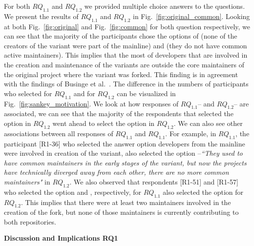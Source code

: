 \nd \textbf{\rqOne}

For both $RQ_{1.1}$ and $RQ_{1.2}$ we provided multiple choice answers to the questions. We present the results of $RQ_{1.1}$ and $RQ_{1.2}$ in Fig.~\ref{fig:original_common}. Looking at both Fig.~\ref{fig:original} and Fig.~\ref{fig:common} for both question respectively, we can see that the majority of the participants chose the options of  (none of the creators of the variant were part of the mainline) and  (they do not have common active maintainers).
This implies that the most of developers that are involved in the creation and maintenance of the variants are outside the core maintainers of the original project where the variant was forked. This finding is in agreement with the findings of Businge et al.~\cite{businge:2018icsme,businge:emse:2021}.
The difference in the numbers of participants who selected   for $RQ_{1.1}$ and  for $RQ_{1.2}$ can be visualized in Fig.~\ref{fig:sankey_motivation}. 
We look at how responses of $RQ_{1.1}$-- and $RQ_{1.2}$-- are associated, we can see that the majority of the respondents that selected the option  in $RQ_{1.2}$ went ahead to select the option  in $RQ_{1.2}$. We can also see other associations between all responses of $RQ_{1.1}$ and $RQ_{1.1}$.
For example, in $RQ_{1.1}$, the participant [R1-36] who selected the answer option  developers from the mainline were involved in creation of the variant, also selected the option --\emph{``They used to have common maintainers in the early stages of the variant, but now the projects have technically diverged away from each other, there are no more common maintainers"} in $RQ_{1.2}$.
We also observed that respondents [R1-51] and [R1-57] who selected the option  and , respectively, for $RQ_{1.1}$ also selected the option  for $RQ_{1.2}$. This implies that there were at least two maintainers involved in the creation of the fork, but none of those maintainers is currently contributing to both repositories. 

\nd \textbf{Discussion and Implications RQ1}

